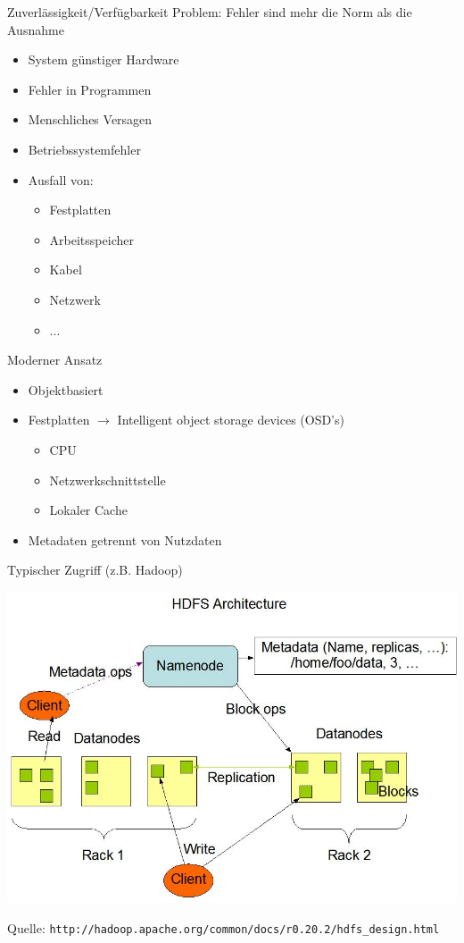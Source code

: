 \documentclass[notes=hide,yellow]{beamer}
\begin{document}
\begin{frame}{Zuverl\"assigkeit/Verf\"ugbarkeit}
	Problem: Fehler sind mehr die Norm als die Ausnahme
	\begin{itemize}
		\item System g\"unstiger Hardware
		\item Fehler in Programmen %
		\item Menschliches Versagen %
		\item Betriebssystemfehler %
		\item Ausfall von: 
		\begin{itemize}
			\item Festplatten
			\item Arbeitsspeicher
			\item Kabel
			\item Netzwerk
			\item ...
		\end{itemize}
	\end{itemize}		
\end{frame}

\begin{frame}{Moderner Ansatz}
	\begin{itemize}
		\item Objektbasiert
		\item Festplatten $\rightarrow$ Intelligent object storage devices (OSD's)
		\begin{itemize}
			\item CPU
			\item Netzwerkschnittstelle
			\item Lokaler Cache
		\end{itemize}
		\item Metadaten getrennt von Nutzdaten
	\end{itemize}
\end{frame}


\begin{frame}{Typischer Zugriff (z.B. Hadoop)}
	\begin{center}
	\includegraphics[scale=0.2]{hdfsarchitecture.jpg}
	\end{center}
	\small
	Quelle: \texttt{http://hadoop.apache.org/common/docs/r0.20.2/hdfs\_design.html}
\end{frame}
\end{document}
